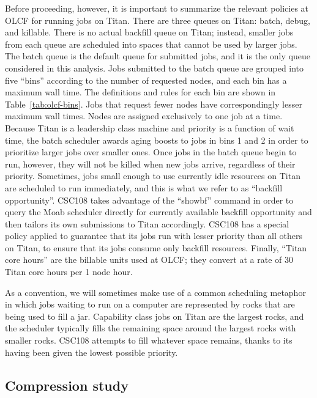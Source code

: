 Before proceeding, however, it is important to summarize the relevant policies
at OLCF for running jobs on Titan. There are three queues on Titan: batch,
debug, and killable. There is no actual backfill queue on Titan; instead,
smaller jobs from each queue are scheduled into spaces that cannot be used by
larger jobs.  The batch queue is the default queue for submitted jobs,
and it is the only queue considered in this analysis. Jobs submitted to the
batch queue are grouped into five ``bins'' according to the number of
requested nodes, and each bin has a maximum wall time. The definitions and
rules for each bin are shown in Table~\ref{tab:olcf-bins}. Jobs that request
fewer nodes have correspondingly lesser maximum wall times. Nodes are assigned
exclusively to one job at a time. Because Titan is a leadership class machine
and priority is a function of wait time, the batch scheduler awards aging
boosts to jobs in bins 1 and 2 in order to prioritize larger jobs over smaller
ones. Once jobs in the batch queue begin to run, however, they will not be
killed when new jobs arrive, regardless of their priority. Sometimes, jobs
small enough to use currently idle resources on Titan are scheduled to run
immediately, and this is what we refer to as ``backfill opportunity''. CSC108
takes advantage of the ``showbf'' command in order to query the Moab scheduler
directly for currently available backfill opportunity and then tailors its own
submissions to Titan accordingly. CSC108 has a special policy applied to
guarantee that its jobs run with lesser priority than all others on Titan, to
ensure that its jobs consume only backfill resources. Finally, ``Titan core
hours'' are the billable units used at OLCF; they convert at a rate of 30
Titan core hours per 1 node hour.

As a convention, we will sometimes make use of a common scheduling metaphor in
which jobs waiting to run on a computer are represented by rocks that are being
used to fill a jar. Capability class jobs on Titan are the largest rocks, and
the scheduler typically fills the remaining space around the largest rocks
with smaller rocks. CSC108 attempts to fill whatever space remains, thanks
to its having been given the lowest possible priority.

\subsection{Compression study}
\label{subsec:compression-study}

